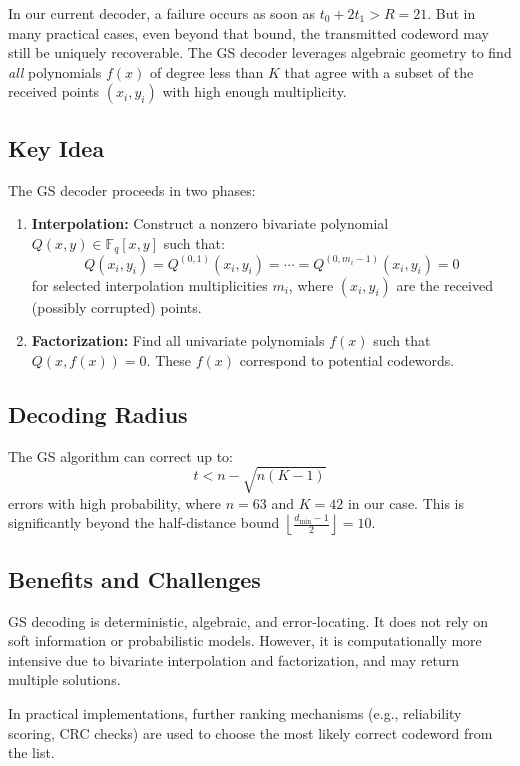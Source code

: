 \documentclass[11pt]{article}
\begin{document}
In our current decoder, a failure occurs as soon as \( t_0 + 2t_1 > R = 21 \). But in many practical cases, even beyond that bound, the transmitted codeword may still be uniquely recoverable. The GS decoder leverages algebraic geometry to find \emph{all} polynomials \( f(x) \) of degree less than \( K \) that agree with a subset of the received points \( (x_i, y_i) \) with high enough multiplicity.

\subsection{Key Idea}

The GS decoder proceeds in two phases:

\begin{enumerate}
    \item \textbf{Interpolation:} Construct a nonzero bivariate polynomial \( Q(x, y) \in \mathbb{F}_q[x, y] \) such that:
    \[
    Q(x_i, y_i) = Q^{(0,1)}(x_i, y_i) = \cdots = Q^{(0,m_i-1)}(x_i, y_i) = 0
    \]
    for selected interpolation multiplicities \( m_i \), where \( (x_i, y_i) \) are the received (possibly corrupted) points.
    
    \item \textbf{Factorization:} Find all univariate polynomials \( f(x) \) such that \( Q(x, f(x)) = 0 \). These \( f(x) \) correspond to potential codewords.
\end{enumerate}

\subsection{Decoding Radius}

The GS algorithm can correct up to:
\[
t < n - \sqrt{n(K-1)}
\]
errors with high probability, where \( n = 63 \) and \( K = 42 \) in our case. This is significantly beyond the half-distance bound \( \left\lfloor \frac{d_{\min}-1}{2} \right\rfloor = 10 \).

\subsection{Benefits and Challenges}

GS decoding is deterministic, algebraic, and error-locating. It does not rely on soft information or probabilistic models. However, it is computationally more intensive due to bivariate interpolation and factorization, and may return multiple solutions.

In practical implementations, further ranking mechanisms (e.g., reliability scoring, CRC checks) are used to choose the most likely correct codeword from the list.
\end{document}
